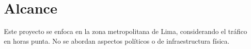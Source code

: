 \section*{Alcance}
Este proyecto se enfoca en la zona metropolitana de Lima, considerando el tráfico en horas punta. No se abordan aspectos políticos o de infraestructura física.
